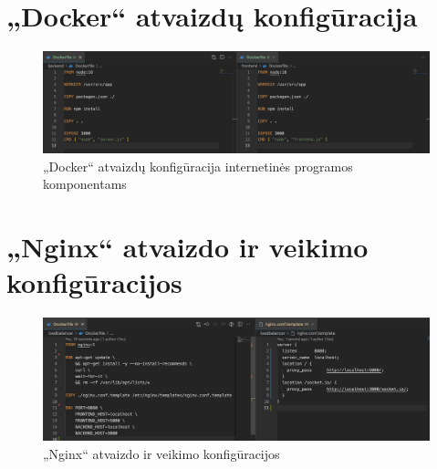 \documentclass{VUMIFPSkursinis}
\begin{document}
\section{„Docker“ atvaizdų konfigūracija}
\label{priedas3}
\begin{figure}[H]
    \centering
    \includegraphics[scale=0.45]{img/priedai/dockerfiles.png}
    \caption{„Docker“ atvaizdų konfigūracija internetinės programos komponentams}
    \label{img:mlp}
\end{figure}

\section{„Nginx“ atvaizdo ir veikimo konfigūracijos}
\label{priedas4}
\begin{figure}[H]
    \centering
    \includegraphics[scale=0.45]{img/priedai/nginx.png}
    \caption{„Nginx“ atvaizdo ir veikimo konfigūracijos}
    \label{img:mlp}
\end{figure}
\end{document}
